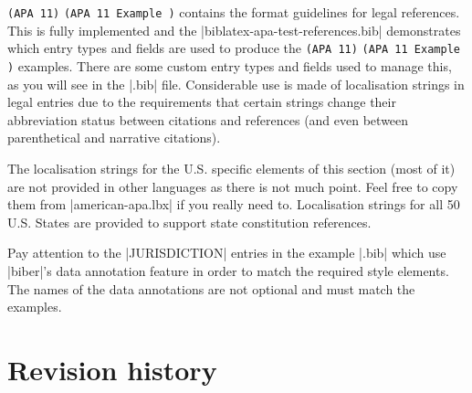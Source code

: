 \documentclass{ltxdockit}
\newcommand\apa[2][]{\ifthenelse{\equal{#1}{}}%
                       {\texttt{(APA #2)}}%
                       {\texttt{(APA #2 Example #1)}}}
\begin{document}
\apa{11} contains the format guidelines for legal references. This is fully
implemented and the |biblatex-apa-test-references.bib| demonstrates which
entry types and fields are used to produce the \apa{11} examples. There are
some custom entry types and fields used to manage this, as you will see in
the |.bib| file. Considerable use is made of localisation strings in legal
entries due to the requirements that certain strings change their
abbreviation status between citations and references (and even between
parenthetical and narrative citations).

The localisation strings for the U.S. specific elements of this section
(most of it) are not provided in other languages as there is not much
point. Feel free to copy them from |american-apa.lbx| if you really need
to. Localisation strings for all 50 U.S. States are provided to support
state constitution references.

Pay attention to the |JURISDICTION| entries in the example |.bib| which use
|biber|'s data annotation feature in order to match the required style
elements. The names of the data annotations are not optional and must match
the examples.

\section{Revision history}\label{rev}
\end{document}
